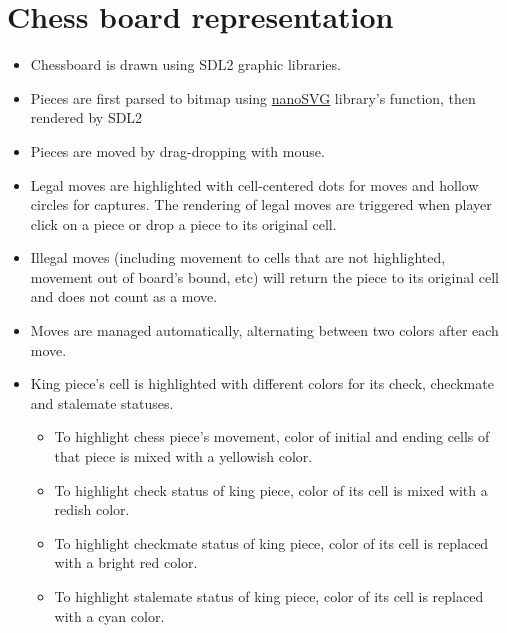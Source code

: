 \documentclass[a4paper, 10pt, titlepage]{report}
\begin{document}
\section{Chess board representation}
\begin{itemize}
    \item Chessboard is drawn using SDL2 graphic libraries.
    \item Pieces are first parsed to bitmap using \href{https://github.com/memononen/nanosvg}{nanoSVG} library's function, then rendered by SDL2
    \item Pieces are moved by drag-dropping with mouse.
    \item Legal moves are highlighted with cell-centered dots for moves and hollow circles for captures. The rendering of legal moves are triggered when player click on a piece or drop a piece to its original cell.
    \item Illegal moves (including movement to cells that are not highlighted, movement out of board's bound, etc) will return the piece to its original cell and does not count as a move.
    \item Moves are managed automatically, alternating between two colors after each move.
    \item King piece's cell is highlighted with different colors for its check, checkmate and stalemate statuses.
          \begin{itemize}
              \item To highlight chess piece's movement, color of initial and ending cells of that piece is mixed with a yellowish color.
              \item To highlight check status of king piece, color of its cell is mixed with a redish color.
              \item To highlight checkmate status of king piece, color of its cell is replaced with a bright red color.
              \item To highlight stalemate status of king piece, color of its cell is replaced with a cyan color.
          \end{itemize}
\end{itemize}
\end{document}
